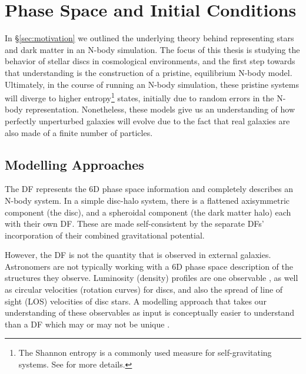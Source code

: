 \section{Phase Space and Initial Conditions} \label{sec:galaxy_ics}
In \S\ref{sec:motivation} we outlined the underlying theory behind representing stars and dark matter in an N-body simulation. The focus of this thesis is studying the behavior of stellar discs in cosmological environments, and the first step towards that understanding is the construction of a pristine, equilibrium N-body model. Ultimately, in the course of running an N-body simulation, these pristine systems will diverge to higher entropy\footnote{The Shannon entropy is a commonly used measure for self-gravitating systems. See \citet{BT} for more details.} states, initially due to random errors in the N-body representation. Nonetheless, these models give us an understanding of how perfectly unperturbed galaxies will evolve due to the fact that real galaxies are also made of a finite number of particles.

\subsection{Modelling Approaches}

The DF represents the 6D phase space information and completely describes an N-body system. In a simple disc-halo system, there is a flattened axisymmetric component (the disc), and a spheroidal component (the dark matter halo) each with their own DF. These are made self-consistent by the separate DFs' incorporation of their combined gravitational potential. 

However, the DF is not the quantity that is observed in external galaxies. Astronomers are not typically working with a 6D phase space description of the structures they observe. Luminosity (density) profiles are one observable , as well as circular velocities (rotation curves) for discs, and also the spread of line of sight (LOS) velocities of disc stars. A modelling approach that takes our understanding of these observables as input is conceptually easier to understand than a DF which may or may not be unique \citep{BT}.

